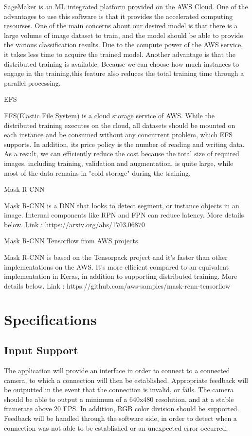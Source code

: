 \documentclass[conference]{IEEEtran}
\begin{document}
SageMaker is an ML integrated platform provided on the AWS Cloud. One of the advantages to use this software is that it provides the accelerated computing resourses. One of the main concerns about our desired model is that there is a large volume of image dataset to train, and the model should be able to provide the various classification results. Due to the compute power of the AWS service, it takes less time to acquire the trained model.
Another advantage is that the distributed training is available. Because we can choose how much instances to engage in the training,this feature also reduces the total training time through a parallel processing.
\newline
\begin{center}
EFS
\end{center}
EFS(Elastic File System) is a cloud storage service of AWS. While the distributed training executes on the cloud, all datasets should be mounted on each instance and be consumed without any concurrent problem, which EFS supports. In addition, its price policy is the number of reading and writing data. As a result, we can efficiently reduce the cost because the total size of required images, including training, validation and augmentation, is quite large, while most of the data remains in "cold storage" during the training.
\newline
\begin{center}
Mask R-CNN
\end{center}
Mask R-CNN is a DNN that looks to detect segment, or instance objects in an image. Internal components like RPN and FPN can reduce latency. More details below.
\newline
Link : https://arxiv.org/abs/1703.06870
\newline
\begin{center}
Mask R-CNN Tensorflow from AWS projects
\end{center}
Mask R-CNN is based on the Tensorpack project and it's faster than other implementations on the AWS. It's more efficient compared to an equivalent implementation in Keras, in addition to supporting distributed training. More details below.
\newline
Link : https://github.com/aws-samples/mask-rcnn-tensorflow
  

\section{Specifications}
\subsection{Input Support}
The application will provide an interface in order to connect to a connected camera, to which a connection will then be established. Appropriate feedback will be outputted in the event that the connection is invalid, or fails.
\newline
The camera should be able to output a minimum of a 640x480 resolution, and at a stable framerate above 20 FPS. In addition, RGB color division should be supported. Feedback will be handled through the software side, in order to detect when a connection was not able to be established or an unexpected error occurred.
\end{document}
